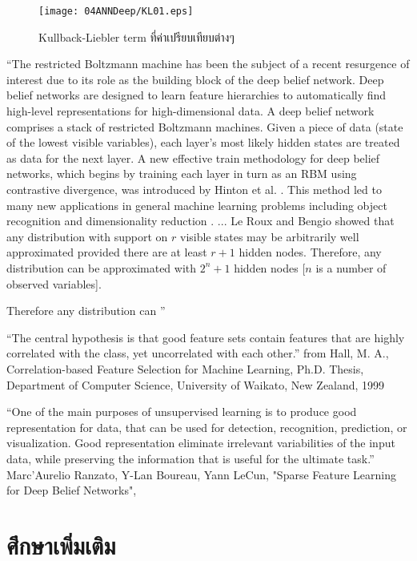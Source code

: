 %
\begin{figure}
\begin{center}
\texttt{[image: 04ANNDeep/KL01.eps]}
\end{center}
\caption{Kullback-Liebler term ที่ค่าเปรียบเทียบต่างๆ}
\label{fig: deep KL characteristics}
\end{figure}
%



``The restricted Boltzmann machine has been the subject of a recent resurgence of interest due to its role as the building block of the deep belief network. Deep belief networks are designed to learn feature hierarchies to automatically find high-level representations for high-dimensional data. A deep belief network comprises a stack of restricted Boltzmann machines. Given a piece of data (state of the lowest visible variables), each layer's most likely hidden states are treated as data for the next layer. A new effective train methodology for deep belief networks, which begins by training each layer in turn as an RBM using contrastive divergence, was introduced by Hinton et al. \cite{HintonEtAl2006a}. This method led to many new applications in general machine learning problems including object recognition and dimensionality reduction \cite{HintonSalakhutdinov2006a}. ... 
Le Roux and Bengio \cite{LeRouxBengio2008a} showed that any distribution with support on $r$ visible states may be arbitrarily well approximated provided there are at least $r+1$ hidden nodes.
Therefore, any distribution can be approximated with $2^n + 1$ hidden nodes [$n$ is a number of observed variables].

Therefore any distribution can  '' \cite{CuetoEtAl2009a}

``The central hypothesis is that good feature sets contain features that are highly correlated
with the class, yet uncorrelated with each other.'' from Hall, M. A., Correlation-based Feature Selection for Machine Learning, Ph.D. Thesis, Department of Computer Science, University of Waikato, New Zealand, 1999


``One of the main purposes of unsupervised learning is to produce good representation for data, that can be used for detection, recognition, prediction, or visualization. Good representation eliminate irrelevant variabilities of the input data, while preserving the information that is useful for the ultimate task.''
Marc'Aurelio Ranzato, Y-Lan Boureau, Yann LeCun, "Sparse Feature Learning for Deep Belief Networks", 

\section{ศึกษาเพิ่มเติม}

